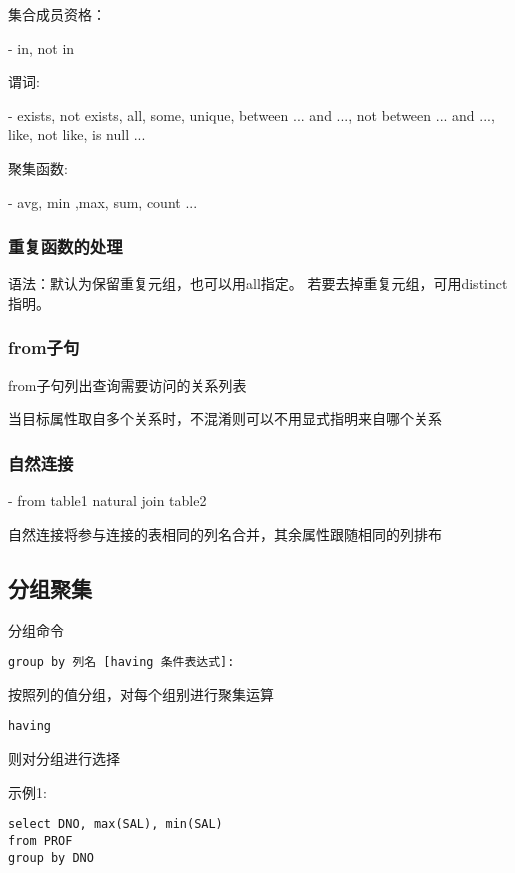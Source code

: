 \documentclass{article}        %
\begin{document}
集合成员资格：

- in, not in

谓词:

- exists, not exists, all, some, unique, between ... and ..., not between ... and ..., 
like, not like, is null ... 

聚集函数:

- avg, min ,max, sum, count ... 

\subsubsection{重复函数的处理}

语法：默认为保留重复元组，也可以用all指定。
若要去掉重复元组，可用distinct指明。

\subsubsection{from子句}

from子句列出查询需要访问的关系列表

当目标属性取自多个关系时，不混淆则可以不用显式指明来自哪个关系

\subsubsection{自然连接}

- from table1 natural join table2 

自然连接将参与连接的表相同的列名合并，其余属性跟随相同的列排布 


\subsection{分组聚集}

分组命令

\begin{verbatim}
group by 列名 [having 条件表达式]:
\end{verbatim}

按照列的值分组，对每个组别进行聚集运算

\begin{verbatim}
having
\end{verbatim}

则对分组进行选择


示例1:

\begin{verbatim}
select DNO, max(SAL), min(SAL)
from PROF 
group by DNO
\end{verbatim}
\end{document}
